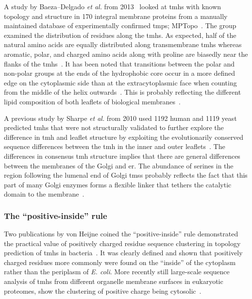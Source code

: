 A study by Baeza\---Delgado \textit{ et al.} from 2013~\cite{Baeza-Delgado2013} looked at \gls{tmh}s with known topology and structure in 170 integral membrane proteins from a manually maintained database of experimentally confirmed \gls{tmp}s; MPTopo~\cite{Jayasinghe2001}.
The group examined the distribution of residues along the \gls{tmh}s.
As expected, half of the natural amino acids are equally distributed along transmembrane \gls{tmh}s whereas aromatic, polar, and charged amino acids along with proline are biasedly near the flanks of the \gls{tmh}s~\cite{Baeza-Delgado2013}.
It has been noted that transitions between the polar and non-polar groups at the ends of the hydrophobic core occur in a more defined edge on the cytoplasmic side than at the extracytoplasmic face when counting from the middle of the helix outwards~\cite{Baeza-Delgado2013}.
This is probably reflecting the different lipid composition of both leaflets of biological membranes~\cite{Baeza-Delgado2013}.

A previous study by Sharpe \textit{et al.} from 2010 used 1192 human and 1119 yeast predicted \gls{tmh}s that were not structurally validated to further explore the difference in \gls{tmh} and leaflet structure by exploiting the evolutionarily conserved sequence differences between the \gls{tmh} in the inner and outer leaflets~\cite{Sharpe2010}.
The differences in consensus \gls{tmh} structure implies that there are general differences between the membranes of the Golgi and \gls{er}.
The abundance of serines in the region following the lumenal end of Golgi \gls{tms}s probably reflects the fact that this part of many Golgi enzymes forms a flexible linker that tethers the catalytic domain to the membrane~\cite{Sharpe2010}.

\subsubsection{The ``positive\--inside'' rule}

Two publications by von Heijne coined the ``positive-inside'' rule demonstrated the practical value of positively charged residue sequence clustering in topology prediction of \gls{tmh}s in bacteria~\cite{VonHeijne1989,Andersson1992}.
It was clearly defined and shown that positively charged residues more commonly were found on the ``inside'' of the cytoplasm rather than the periplasm of \textit{ E.
coli}.
More recently still large-scale sequence analysis of \gls{tmh}s from different organelle membrane surfaces in eukaryotic proteomes, show the clustering of positive charge being cytosolic~\cite{Sharpe2010, Baeza-Delgado2013, Pogozheva2013}.

